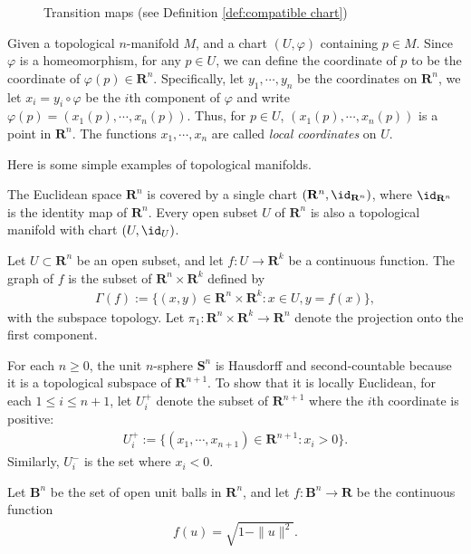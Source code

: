 \begin{figure}[h]
    \centering
    
    \caption{Transition maps (see Definition \ref{def:compatible chart})}
\end{figure}

Given a topological $n$-manifold $M$, and a chart $(U, \varphi)$ containing $p \in M$. Since $\varphi$ is a homeomorphism, for any $p \in U$, we can define the coordinate of $p$ to be the coordinate of $\varphi(p) \in \mathbf{R}^n$. Specifically, let $y_1, \cdots, y_n$ be the coordinates on $\mathbf{R}^n$, we let $x_i = y_i \circ \varphi$ be the $i$th component of $\varphi$ and write $\varphi(p) = (x_1(p), \cdots, x_n(p))$. Thus, for $p \in U$, $(x_1(p), \cdots, x_n(p))$ is a point in $\mathbf{R}^n$. The functions $x_1, \cdots, x_n$ are called \emph{local coordinates} on $U$.

Here is some simple examples of topological manifolds.

\begin{example}
    The Euclidean space $\mathbf{R}^n$ is covered by a single chart $(\mathbf{R}^n, \id_{\mathbf{R}^n})$, where $\id_{\mathbf{R}^n}$ is the identity map of $\mathbf{R}^n$. Every open subset $U$ of $\mathbf{R}^n$ is also a topological manifold with chart $(U, \id_U)$.
\end{example}

\begin{example}
    Let $U \subset \mathbf{R}^n$ be an open subset, and let $f : U \to \mathbf{R}^k$ be a continuous function. The graph of $f$ is the subset of $\mathbf{R}^n \times \mathbf{R}^k$ defined by
    \begin{align*}
        \Gamma(f) := \{(x, y) \in \mathbf{R}^n \times \mathbf{R}^k : x \in U, y = f(x)\},
    \end{align*}
    with the subspace topology. Let $\pi_1 : \mathbf{R}^n \times \mathbf{R}^k \to \mathbf{R}^n$ denote the projection onto the first component.
\end{example}

\begin{example}[Spheres]
    For each $n \geq 0$, the unit $n$-sphere $\mathbf{S}^n$ is Hausdorff and second-countable because it is a topological subspace of $\mathbf{R}^{n + 1}$. To show that it is locally Euclidean, for each $1 \leq i \leq n + 1$, let $U_i^+$ denote the subset of $\mathbf{R}^{n + 1}$ where the $i$th coordinate is positive:
    \begin{align*}
        U_i^+ := \{(x_1, \cdots, x_{n + 1}) \in \mathbf{R}^{n + 1} : x_i > 0\}.
    \end{align*}
    Similarly, $U_i^-$ is the set where $x_i < 0$.

    Let $\mathbf{B}^n$ be the set of open unit balls in $\mathbf{R}^n$, and let $f : \mathbf{B}^n \to \mathbf{R}$ be the continuous function
    \begin{align*}
        f(u) = \sqrt{1 - \|u\|^2}.
    \end{align*}
\end{example}

